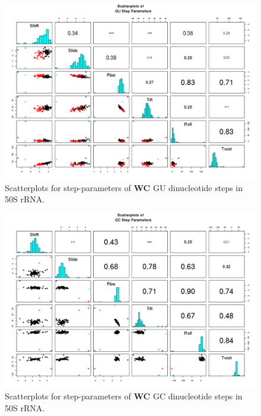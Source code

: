 \begin{figure}[H]
\centering
\includegraphics[angle=90, scale=0.6]{WC/GU.png}
\caption{Scatterplots for step-parameters of \textbf{WC} GU dinucleotide steps
in 50S rRNA.}
\label{fig:stepsGU}
\end{figure}

\begin{figure}[H]
\centering
\includegraphics[angle=90, scale=0.6]{WC/GC.png}
\caption{Scatterplots for step-parameters of \textbf{WC} GC dinucleotide steps
in 50S rRNA.}
\label{fig:stepsGC}
\end{figure}


%
\printindex
